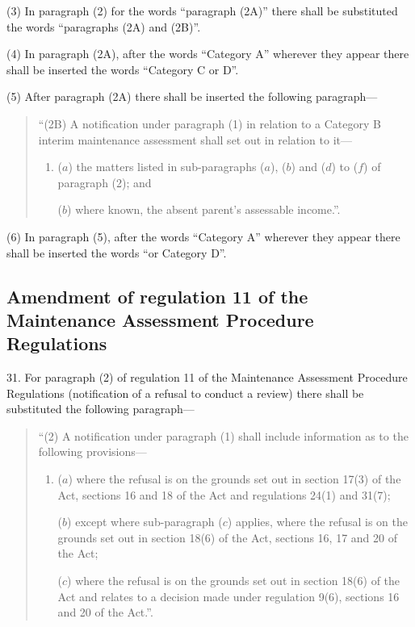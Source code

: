 \documentclass[12pt,a4paper]{article}
\begin{document}
(3) In paragraph (2) for the words “paragraph (2A)” there shall be substituted the words “paragraphs (2A) and (2B)”.

(4) In paragraph (2A), after the words “Category A” wherever they appear there shall be inserted the words “Category C or D”.

(5) After paragraph (2A) there shall be inserted the following paragraph—
\begin{quotation}
“(2B) A notification under paragraph (1) in relation to a Category B interim maintenance assessment shall set out in relation to it—
\begin{enumerate}\item[]
($a$) the matters listed in sub-paragraphs ($a$), ($b$) and ($d$) to ($f$) of paragraph (2); and

($b$) where known, the absent parent’s assessable income.”.
\end{enumerate}
\end{quotation}

(6) In paragraph (5), after the words “Category A” wherever they appear there shall be inserted the words “or Category D”.

\subsection[31. Amendment of regulation 11 of the Maintenance Assessment Procedure Regulations]{Amendment of regulation 11 of the Maintenance Assessment Procedure Regulations}

31.  For paragraph (2) of regulation 11 of the Maintenance Assessment Procedure Regulations (notification of a refusal to conduct a review) there shall be substituted the following paragraph—
\begin{quotation}
“(2) A notification under paragraph (1) shall include information as to the following provisions—
\begin{enumerate}\item[]
($a$) where the refusal is on the grounds set out in section 17(3) of the Act, sections 16 and 18 of the Act and regulations 24(1) and 31(7);

($b$) except where sub-paragraph ($c$) applies, where the refusal is on the grounds set out in section 18(6) of the Act, sections 16, 17 and 20 of the Act;

($c$) where the refusal is on the grounds set out in section 18(6) of the Act and relates to a decision made under regulation 9(6), sections 16 and 20 of the Act.”.
\end{enumerate}
\end{quotation}
\end{document}
